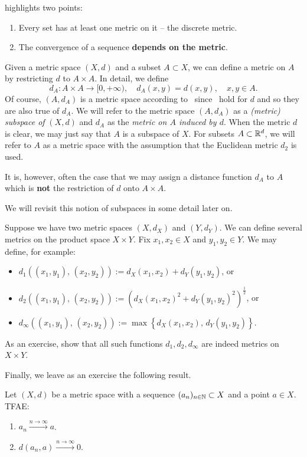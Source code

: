  highlights two points:
\begin{enumerate}
	\item Every set has at least one metric on it -- the discrete metric.
	\item The convergence of a sequence \textbf{depends on the metric}.
\end{enumerate}
\begin{eg}
	\label{eg:sub_met}
	Given a metric space $(X,d)$ and a subset $A\subset X$, we can define a metric on $A$ by restricting $d$ to $A\times A$. In detail, we define
	\[
	d_A:A\times A \to [0,+\infty),\quad d_A(x,y) = d(x,y),\quad x,y\in A.
	\]
	Of course, $(A,d_A)$ is a metric space according to~ since~ hold for $d$ and so they are also true of $d_A$. We will refer to the metric space $(A,d_A)$ as a \textit{(metric) subspace of }$(X,d)$ and $d_A$ as the \textit{metric on $A$ induced by $d$}. When the metric $d$ is clear, we may just say that $A$ is a subspace of $X$. For subsets $A\subset \mathbb{R}^d$, we will refer to $A$ as a metric space with the assumption that the Euclidean metric $d_2$ is used.
	
	It is, however, often the case that we may assign a distance function $d_A$ to $A$ which is \textbf{not} the restriction of $d$ onto $A\times A$.
	
	We will revisit this notion of subspaces in some detail later on.
\end{eg}
\begin{eg}
	Suppose we have two metric spaces $(X,d_X)$ and $(Y,d_Y)$. We can define several metrics on the product space $X\times Y$. Fix $x_1,x_2\in X$ and $y_1,y_2\in Y$. We may define, for example:
	\begin{itemize}
		\item $d_1((x_1,y_1),\,(x_2,y_2)):= d_X(x_1,x_2) + d_Y(y_1,y_2)$, or
		\item $d_2((x_1,y_1),\,(x_2,y_2)):= \left(d_X(x_1,x_2)^2 + d_Y(y_1,y_2)^2\right)^\frac{1}{2}$, or
		\item $d_\infty((x_1,y_1),\,(x_2,y_2)):= \max\left\{d_X(x_1,x_2),\,d_Y(y_1,y_2)\right\}$.
	\end{itemize}
	As an exercise, show that all such functions $d_1,d_2,d_\infty$ are indeed metrics on $X\times Y$.
\end{eg}
Finally, we leave as an exercise the following result.
\begin{ex}
\label{ex:cvg_metric}
Let $(X,d)$ be a metric space with a sequence $(a_n)_{n\in\mathbb{N}}\subset X$ and a point $a\in X$. TFAE:
\begin{enumerate}
	\item $a_n\overset{n\to \infty}{\to} a$.
	\item $d(a_n,a)\overset{n\to \infty}{\to}0$.
\end{enumerate}
\end{ex}
